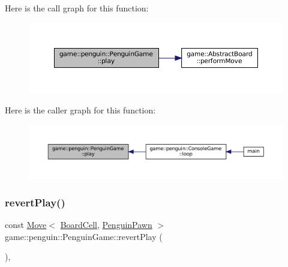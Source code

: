 Here is the call graph for this function\+:
\nopagebreak
\begin{figure}[H]
\begin{center}
\leavevmode
\includegraphics[width=350pt]{classgame_1_1penguin_1_1_penguin_game_aa7fe86e287d704d3bc597893134bd408_cgraph}
\end{center}
\end{figure}
Here is the caller graph for this function\+:
\nopagebreak
\begin{figure}[H]
\begin{center}
\leavevmode
\includegraphics[width=350pt]{classgame_1_1penguin_1_1_penguin_game_aa7fe86e287d704d3bc597893134bd408_icgraph}
\end{center}
\end{figure}
\mbox{\label{classgame_1_1penguin_1_1_penguin_game_a16aabdfdf43ad7b5b417b58eb593e063}} 
\subsubsection{\texorpdfstring{revert\+Play()}{revertPlay()}}
{\footnotesize\ttfamily const \hyperlink{structgame_1_1_move}{Move}$<$ \hyperlink{classgame_1_1penguin_1_1_board_cell}{Board\+Cell}, \hyperlink{classgame_1_1penguin_1_1_penguin_pawn}{Penguin\+Pawn} $>$ game\+::penguin\+::\+Penguin\+Game\+::revert\+Play (\begin{DoxyParamCaption}{ }\end{DoxyParamCaption})\hspace{0.3cm}{\ttfamily [override]}, {\ttfamily [virtual]}}



